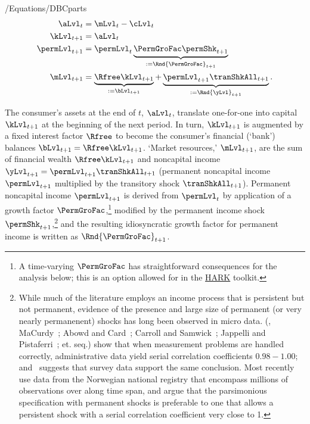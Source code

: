 \documentclass[BufferStockTheory]{subfiles}
\begin{document}
\begin{verbatimwrite}{\econtexRoot/Equations/DBCparts}
  \begin{equation}\label{eq:DBCparts} %
    \begin{aligned}
      \aLvl_{t}     & = \mLvl_{t}-\cLvl_{t}  \\
      \kLvl_{t+1}   & = \aLvl_{t} \notag \\
      \permLvl_{t+1}  & = \permLvl_{t} \underbrace{\PermGroFac\permShk_{t+1}}_{:= \Rnd{\PermGroFac}_{t+1}} \notag \\
      \mLvl_{t+1}  & =   \underbrace{\Rfree \kLvl_{t+1}}_{:= \bLvl_{t+1}}  +\underbrace{\permLvl_{t+1}\tranShkAll_{t+1}}_{:= \Rnd{\yLvl}_{t+1}}. \notag
    \end{aligned}
  \end{equation}
\end{verbatimwrite}\unskip


The consumer's assets at the end of $t$, $\aLvl_{t}$, translate one-for-one into capital $\kLvl_{t+1}$ at the beginning of the next period.
In turn, $\kLvl_{t+1}$ is augmented by a fixed interest factor $\Rfree$ to become the consumer's financial (`bank') balances $\bLvl_{t+1} = \Rfree \kLvl_{t+1}$.  `Market resources,' $\mLvl_{t+1}$,  are the sum of financial wealth $\Rfree \kLvl_{t+1}$ and noncapital income $\yLvl_{t+1}=\permLvl_{t+1}\tranShkAll_{t+1}$ (permanent noncapital income $\permLvl_{t+1}$ multiplied by the transitory shock $\tranShkAll_{t+1}$).
Permanent noncapital income $\permLvl_{t+1}$ is derived from $\permLvl_{t}$ by application of a growth factor $\PermGroFac$,\footnote{A time-varying $\PermGroFac$ has straightforward consequences for the analysis below; this is an option allowed for in the \href{https://econ-ark.org}{HARK} toolkit.} modified by the permanent income shock $\permShk_{t+1}$,\footnote{While much of the literature employs an income process that is persistent but not permanent, evidence of the presence and large size of permanent (or very nearly permanenent) shocks has long been observed in micro data.
  (\cite{lwComponents}, MaCurdy~\citeyearpar{macurdyTimeseries}; Abowd and Card~\citeyearpar{acCovariance}; Carroll and Samwick~\citeyearpar{csNature}; Jappelli and Pistaferri~\citeyear{jpCins}; et. seq.)
  \cite{dhmImproving} show that when measurement problems are handled correctly, administrative data yield serial correlation coefficients $0.98-1.00$; and~\cite{dmHowMuch} suggests that survey data support the same conclusion.  Most recently \cite{crawleyParsimonious} use data from the Norwegian national registry that encompass millions of observations over along time span, and argue that the parsimonious specification with permanent shocks is preferable to one that allows a persistent shock with a serial correlation coefficient very close to 1.
  } and the resulting idiosyncratic growth factor for permanent income is written as $\Rnd{\PermGroFac}_{t+1}$.
\end{document}
